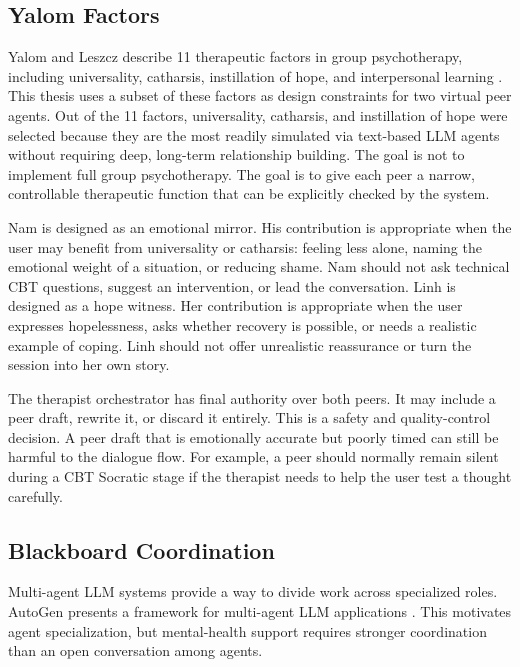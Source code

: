 \subsection{Yalom Factors}

Yalom and Leszcz describe 11 therapeutic factors in group psychotherapy, including universality, catharsis, instillation of hope, and interpersonal learning \citep{Yalom2020GroupPsychotherapy}. This thesis uses a subset of these factors as design constraints for two virtual peer agents. Out of the 11 factors, universality, catharsis, and instillation of hope were selected because they are the most readily simulated via text-based LLM agents without requiring deep, long-term relationship building. The goal is not to implement full group psychotherapy. The goal is to give each peer a narrow, controllable therapeutic function that can be explicitly checked by the system.

Nam is designed as an emotional mirror. His contribution is appropriate when the user may benefit from universality or catharsis: feeling less alone, naming the emotional weight of a situation, or reducing shame. Nam should not ask technical CBT questions, suggest an intervention, or lead the conversation. Linh is designed as a hope witness. Her contribution is appropriate when the user expresses hopelessness, asks whether recovery is possible, or needs a realistic example of coping. Linh should not offer unrealistic reassurance or turn the session into her own story.

The therapist orchestrator has final authority over both peers. It may include a peer draft, rewrite it, or discard it entirely. This is a safety and quality-control decision. A peer draft that is emotionally accurate but poorly timed can still be harmful to the dialogue flow. For example, a peer should normally remain silent during a CBT Socratic stage if the therapist needs to help the user test a thought carefully.

\subsection{Blackboard Coordination}

Multi-agent LLM systems provide a way to divide work across specialized roles. AutoGen presents a framework for multi-agent LLM applications \citep{Wu2023AutoGen}. This motivates agent specialization, but mental-health support requires stronger coordination than an open conversation among agents.

